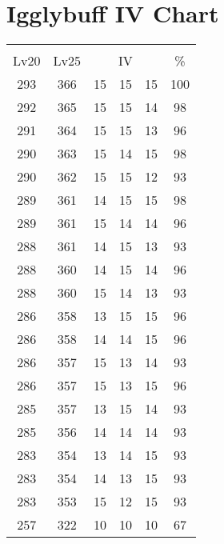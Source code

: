 \documentclass{article}%
\begin{document}
%
\normalsize%
\section{Igglybuff IV Chart}%
\label{sec:Igglybuff IV Chart}%
\renewcommand{\arraystretch}{1.5}%
\begin{tabular}{|c|c|c|c|c|c|}%
\hline%
\multicolumn{6}{|c|}{\textcolor{white}{ 
\linebreak{Igglybuff}
}%
\cellcolor{black}}\\%
\multicolumn{1}{|c}{Lv20}&\multicolumn{1}{c|}{Lv25}&\multicolumn{3}{c|}{IV}&\multicolumn{1}{|c|}{\%}\\%
\hline%
\rowcolor{color100}%
293&366&15&15&15&100\\%
\hline%
\rowcolor{color98}%
292&365&15&15&14&98\\%
\hline%
\rowcolor{color96}%
291&364&15&15&13&96\\%
\hline%
\rowcolor{color98}%
290&363&15&14&15&98\\%
\hline%
\rowcolor{color93}%
290&362&15&15&12&93\\%
\hline%
\rowcolor{color98}%
289&361&14&15&15&98\\%
\hline%
\rowcolor{color96}%
289&361&15&14&14&96\\%
\hline%
\rowcolor{color93}%
288&361&14&15&13&93\\%
\hline%
\rowcolor{color96}%
288&360&14&15&14&96\\%
\hline%
\rowcolor{color93}%
288&360&15&14&13&93\\%
\hline%
\rowcolor{color96}%
286&358&13&15&15&96\\%
\hline%
\rowcolor{color96}%
286&358&14&14&15&96\\%
\hline%
\rowcolor{color93}%
286&357&15&13&14&93\\%
\hline%
\rowcolor{color96}%
286&357&15&13&15&96\\%
\hline%
\rowcolor{color93}%
285&357&13&15&14&93\\%
\hline%
\rowcolor{color93}%
285&356&14&14&14&93\\%
\hline%
\rowcolor{color93}%
283&354&13&14&15&93\\%
\hline%
\rowcolor{color93}%
283&354&14&13&15&93\\%
\hline%
\rowcolor{color93}%
283&353&15&12&15&93\\%
\hline%
\rowcolor{color91}%
257&322&10&10&10&67\\%
\end{tabular}

%
\end{document}
